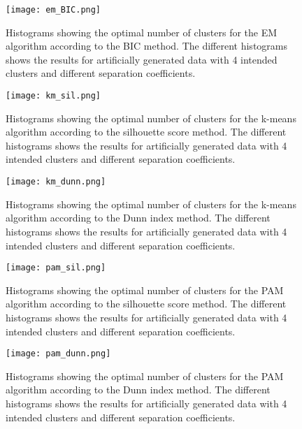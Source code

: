 \documentclass[11pt,twoside,swedish]{article}
\begin{document}
\begin{figure}
\begin{center}
\texttt{[image: em\_BIC.png]}
\caption{Histograms showing the optimal number of clusters for the EM
  algorithm according to the BIC method. The different
  histograms shows the results for artificially generated data with 4
  intended clusters and different separation coefficients.}
\label{em_BIC_hists}
\end{center}
\end{figure}

\begin{figure}
\begin{center}
\texttt{[image: km\_sil.png]}
\caption{Histograms showing the optimal number of clusters for the k-means
  algorithm according to the silhouette score method. The different
  histograms shows the results for artificially generated data with 4
  intended clusters and different separation coefficients.}
\label{km_sil_hists}
\end{center}
\end{figure}

\begin{figure}
\begin{center}
\texttt{[image: km\_dunn.png]}
\caption{Histograms showing the optimal number of clusters for the k-means
  algorithm according to the Dunn index method. The different
  histograms shows the results for artificially generated data with 4
  intended clusters and different separation coefficients.}
\label{km_dunn_hists}
\end{center}
\end{figure}


\begin{figure}
\begin{center}
\texttt{[image: pam\_sil.png]}
\caption{Histograms showing the optimal number of clusters for the PAM
  algorithm according to the silhouette score method. The different
  histograms shows the results for artificially generated data with 4
  intended clusters and different separation coefficients.}
\label{pam_sil_hists}
\end{center}
\end{figure}

\begin{figure}
\begin{center}
\texttt{[image: pam\_dunn.png]}
\caption{Histograms showing the optimal number of clusters for the PAM
  algorithm according to the Dunn index method. The different
  histograms shows the results for artificially generated data with 4
  intended clusters and different separation coefficients.}
\label{pam_dunn_hists}
\end{center}
\end{figure}
\end{document}
